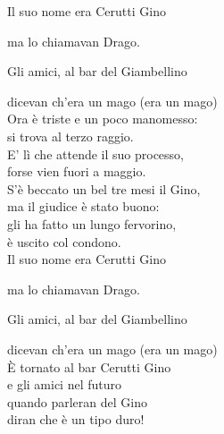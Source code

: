 \documentclass[10pt, twoside, a4paper]{article}
\begin{document}
\begin{multicols}{2}
\hspace{8pt} Il suo nome era Cerutti Gino

\hspace{8pt} ma lo chiamavan Drago.

\hspace{8pt} Gli amici, al bar del Giambellino

\hspace{8pt} dicevan ch'era un mago (era un mago)\\

Ora è triste e un poco manomesso:\\
si trova al terzo raggio.\\
E' lì che attende il suo processo,\\
forse vien fuori a maggio.\\

S'è beccato un bel tre mesi il Gino,\\
ma il giudice è stato buono:\\
gli ha fatto un lungo fervorino,\\
è uscito col condono.\\

\hspace{8pt} Il suo nome era Cerutti Gino

\hspace{8pt} ma lo chiamavan Drago.

\hspace{8pt} Gli amici, al bar del Giambellino

\hspace{8pt} dicevan ch'era un mago (era un mago)\\

È tornato al bar Cerutti Gino\\
e gli amici nel futuro\\
quando parleran del Gino\\
diran che è un tipo duro!\\
\end{multicols}
\end{document}
